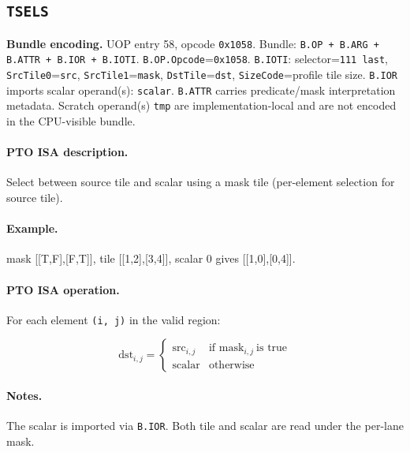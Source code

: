 \subsection{\texttt{TSELS}}
\noindent\textbf{Bundle encoding.} UOP entry 58, opcode \texttt{0x1058}. Bundle: \texttt{B.OP + B.ARG + B.ATTR + B.IOR + B.IOTI}. \texttt{B.OP.Opcode}=\texttt{0x1058}. \texttt{B.IOTI}: selector=\texttt{111 last}, \texttt{SrcTile0}=\texttt{src}, \texttt{SrcTile1}=\texttt{mask}, \texttt{DstTile}=\texttt{dst}, \texttt{SizeCode}=profile tile size. \texttt{B.IOR} imports scalar operand(s): \texttt{scalar}. \texttt{B.ATTR} carries predicate/mask interpretation metadata. Scratch operand(s) \texttt{tmp} are implementation-local and are not encoded in the CPU-visible bundle.\par\smallskip
{\small
\paragraph{PTO ISA description.}
Select between source tile and scalar using a mask tile (per-element selection for source tile).
\paragraph{Example.}
mask [[T,F],[F,T]], tile [[1,2],[3,4]], scalar 0 gives [[1,0],[0,4]].
\par\smallskip
\paragraph{PTO ISA operation.}
For each element \texttt{(i, j)} in the valid region:

\[
\mathrm{dst}_{i,j} =
\begin{cases}
\mathrm{src}_{i,j} & \text{if } \mathrm{mask}_{i,j}\ \text{is true} \\
\mathrm{scalar} & \text{otherwise}
\end{cases}
\]
}\par\smallskip
\paragraph{Notes.}
The scalar is imported via \texttt{B.IOR}. Both tile and scalar are read under the per-lane mask.
